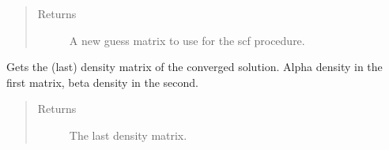 \documentclass[letterpaper,10pt,english]{sphinxmanual}
\begin{document}
\begin{fulllineitems}
\begin{fulllineitems}
\begin{sphinxVerbatim}[commandchars=\\\{\}]
   
           
   
  
\end{sphinxVerbatim}
\begin{quote}\begin{description}
\item[{Returns}] \leavevmode
A new guess matrix to use for the scf procedure.

\end{description}\end{quote}

\end{fulllineitems}


\begin{fulllineitems}
\label{\detokenize{UHF:hf.HartreeFock.UHF.MF.get_dens}}
Gets the (last) density matrix of the converged solution.
Alpha density in the first matrix, beta density in the second.
\begin{quote}\begin{description}
\item[{Returns}] \leavevmode
The last density matrix.

\end{description}\end{quote}

\end{fulllineitems}


\end{fulllineitems}
\end{document}
